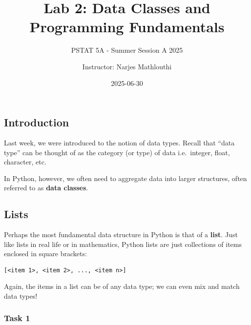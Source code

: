 \documentclass[
  11pt,
]{article}
\title{Lab 2: Data Classes and Programming Fundamentals}
\subtitle{PSTAT 5A - Summer Session A 2025}
\author{Instructor: Narjes Mathlouthi}
\date{2025-06-30}
\renewcommand*\contentsname{Table of contents}
\newcommand\contentsname{Table of contents}
\begin{document}
\maketitle

\renewcommand*\contentsname{Table of contents}
{
\hypersetup{linkcolor=}
\setcounter{tocdepth}{3}
\tableofcontents
}


\subsection{Introduction}\label{introduction}

Last week, we were introduced to the notion of data types. Recall that
``data type'' can be thought of as the category (or type) of data
i.e.~integer, float, character, etc.

In Python, however, we often need to aggregate data into larger
structures, often referred to as \textbf{data classes}.

\subsection{Lists}\label{lists}

Perhaps the most fundamental data structure in Python is that of a
\textbf{list}. Just like lists in real life or in mathematics, Python
lists are just collections of items enclosed in square brackets:

\begin{verbatim}
[<item 1>, <item 2>, ..., <item n>]
\end{verbatim}

Again, the items in a list can be of any data type; we can even mix and
match data types!

\subsubsection{Task 1}\label{task-1}
\end{document}
